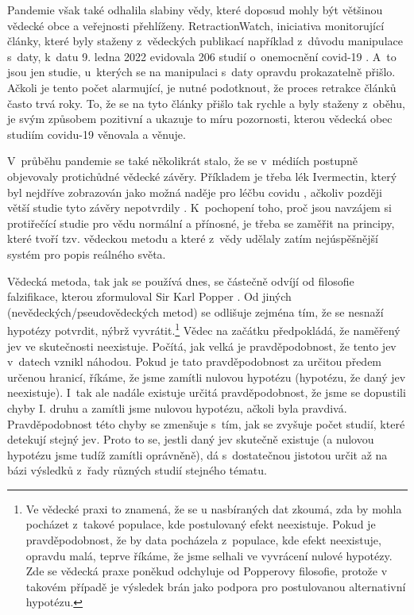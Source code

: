 Pandemie však také odhalila slabiny vědy, které doposud mohly být většinou vědecké obce a veřejnosti přehlíženy. RetractionWatch, iniciativa monitorující články, které byly staženy z~vědeckých publikací například z~důvodu manipulace s~daty, k~datu 9. ledna 2022 evidovala 206 studií o~onemocnění covid-19 \cite{RetractionWatch}. A~to jsou jen studie, u~kterých se na manipulaci s~daty opravdu prokazatelně přišlo. Ačkoli je tento počet alarmující, je nutné podotknout, že proces retrakce článků často trvá roky. To, že se na tyto články přišlo tak rychle a byly staženy z~oběhu, je svým způsobem pozitivní a ukazuje to míru pozornosti, kterou vědecká obec studiím covidu-19 věnovala a věnuje.

V~průběhu pandemie se také několikrát stalo, že se v~médiích postupně objevovaly protichůdné vědecké závěry. Příkladem je třeba lék Ivermectin, který byl nejdříve zobrazován jako možná naděje pro léčbu covidu \cite{Ceskatelevize2020}, ačkoliv později větší studie tyto závěry nepotvrdily \cite{Lopez-Medina2021}. K~pochopení toho, proč jsou navzájem si protiřečící studie pro vědu normální a přínosné, je třeba se zaměřit na principy, které tvoří tzv. vědeckou metodu a které z~vědy udělaly zatím nejúspěšnější systém pro popis reálného světa.

Vědecká metoda, tak jak se používá dnes, se částečně odvíjí od filosofie falzifikace, kterou zformuloval Sir Karl Popper \cite{Popper2002}. Od jiných (ne\-vě\-de\-ckých/pseu\-do\-vě\-de\-ckých metod) se odlišuje zejména tím, že se nesnaží hypotézy potvrdit, nýbrž vyvrátit.\footnote{Ve vědecké praxi to znamená, že se u nasbíraných dat zkoumá, zda by mohla pocházet z~takové populace, kde postulovaný efekt neexistuje. Pokud je pravděpodobnost, že by data pocházela z~populace, kde efekt neexistuje, opravdu malá, teprve říkáme, že jsme selhali ve vyvrácení nulové hypotézy. Zde se vědecká praxe poněkud odchyluje od Popperovy filosofie, protože v takovém případě je výsledek brán jako podpora pro postulovanou alternativní hypotézu.} Vědec na začátku předpokládá, že naměřený jev ve skutečnosti neexistuje. Počítá, jak velká je pravděpodobnost, že tento jev v~datech vznikl náhodou. Pokud je tato pravděpodobnost za určitou předem určenou hranicí, říkáme, že jsme zamítli nulovou hypotézu (hypotézu, že daný jev neexistuje). I~tak ale nadále existuje určitá pravděpodobnost, že jsme se dopustili chyby I. druhu a zamítli jsme nulovou hypotézu, ačkoli byla pravdivá. Pravděpodobnost této chyby se zmenšuje s~tím, jak se zvyšuje počet studií, které detekují stejný jev. Proto to se, jestli daný jev skutečně existuje (a nulovou hypotézu jsme tudíž zamítli oprávněně), dá s~dostatečnou jistotou určit až na bázi výsledků z~řady různých studií stejného tématu.

